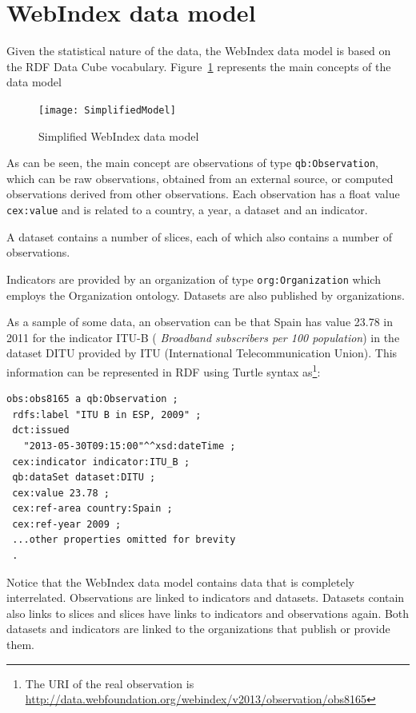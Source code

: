 \documentclass{llncs}
\begin{document}
\section{WebIndex data model}

Given the statistical nature of the data, the WebIndex data model is based on the RDF Data Cube vocabulary. Figure~\ref{SimplifiedModel} represents the main concepts of the data model

\begin{figure}[h]
\label{SimplifiedModel}
\begin{center}
\texttt{[image: SimplifiedModel]}
\end{center}
\caption{Simplified WebIndex data model}
\end{figure}

As can be seen, the main concept are observations of type \lstinline|qb:Observation|, which 
can be raw observations,
obtained from an external source, 
or computed observations derived from other observations. 
Each observation has a float value \lstinline|cex:value| 
and is related to a country, a year, a dataset 
and an indicator.

A dataset contains a number of slices, each of which also contains a number of observations. 

Indicators are provided by an organization of type \lstinline|org:Organization| which employs the Organization ontology\cite{Organization14}. Datasets are also published by organizations. 

As a sample of some data, 
an observation can be that Spain has value 23.78 in 2011 for the indicator ITU-B ( \emph{Broadband subscribers per 100 population}) in the dataset DITU provided by ITU (International Telecommunication Union). This information can be represented in RDF using Turtle syntax as\footnote{The URI of the real observation is \url{http://data.webfoundation.org/webindex/v2013/observation/obs8165}}:

\begin{lstlisting}[style=Turtle]
obs:obs8165 a qb:Observation ;
 rdfs:label "ITU B in ESP, 2009" ;
 dct:issued
   "2013-05-30T09:15:00"^^xsd:dateTime ;
 cex:indicator indicator:ITU_B ;
 qb:dataSet dataset:DITU ;
 cex:value 23.78 ;
 cex:ref-area country:Spain ;
 cex:ref-year 2009 ;
 ...other properties omitted for brevity
 .
\end{lstlisting}

Notice that the WebIndex data model contains data that is completely interrelated. Observations are linked to indicators and datasets. Datasets contain also links to slices and slices have links to indicators and observations again. 
Both datasets and indicators are linked to the organizations that publish or provide them. 
\end{document}
